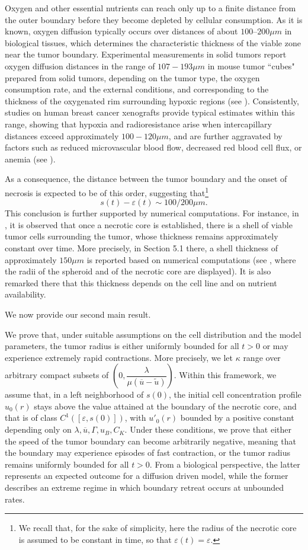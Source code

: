 \documentclass[12pt,a4paper,intlimits,sumlimits]{amsart}
\theoremstyle{definition}
\theoremstyle{plain}
\numberwithin{equation}{section}
\begin{document}
{Oxygen and other essential nutrients can reach only up to a finite distance from the outer boundary before they become depleted by cellular consumption. As it is known, oxygen diffusion typically occurs over distances of about $100–200\mu m$ in biological tissues, which determines the characteristic thickness of the viable zone near the tumor boundary. Experimental measurements in solid tumors report oxygen diffusion distances in the range of $107-193\mu m$ in mouse tumor ``cubes" prepared from solid tumors, depending on the tumor type, the oxygen consumption rate, and the external conditions, and corresponding to the thickness of the oxygenated rim surrounding hypoxic regions (see \cite{Peggyetal}). Consistently, studies on human breast cancer xenografts provide typical estimates within this range, showing that hypoxia and radioresistance arise when intercapillary distances exceed approximately $100-120\mu m$, and are further aggravated by factors such as reduced microvascular blood flow, decreased red blood cell flux, or anemia (see \cite{GroebeVaupel}).

As a consequence, the distance between the tumor boundary and the onset of necrosis is expected to be of this order, suggesting that\footnote{We recall that, for the sake of simplicity, here the radius of the necrotic core is assumed to be constant in time, so that $\varepsilon(t)=\varepsilon$.}
\[
s(t)-\varepsilon(t)\sim 100/200 \mu m.
\]
This conclusion is further supported by numerical computations. For instance, in \cite{SCIU}, it is observed that once a necrotic core is established, there is a shell of viable tumor cells surrounding the tumor, whose thickness remains approximately constant over time.  More precisely, in Section 5.1 there, a shell thickness of approximately $150 \mu m$ is reported based on numerical computations (see \cite[Figure 4(d)]{SCIU}, where the radii of the spheroid and of the necrotic core are displayed). It is also remarked there that this thickness depends on the cell line and on nutrient availability.}

We now provide our second main result. 

We prove that, under suitable assumptions on the cell distribution and the model parameters, the tumor radius is either uniformly bounded for all $t>0$ or may experience extremely rapid contractions. More precisely, we let $\kappa$ range over arbitrary compact subsets of $\left(0, \dfrac{\lambda}{\mu(\overline u-\widetilde u)}\right)$. Within this framework, we assume that, in a left neighborhood of $s(0)$,  the initial cell concentration profile $u_0(r)$ stays above the value attained at the boundary of the necrotic core, and that is of class $C^1 ([\varepsilon, s(0)])$, with $u'_0(r)$ bounded by a positive constant depending only on $\lambda, \overline u, \Gamma, u_B, C_K$. 
Under these conditions, we prove that either the speed of the tumor boundary can become arbitrarily negative, meaning that the boundary may experience episodes of fast contraction, or the tumor radius remains uniformly bounded for all $t>0$. From a biological perspective, the latter represents an expected outcome for a diffusion driven model, while the former describes an extreme regime in which boundary retreat occurs at unbounded rates.
\end{document}
